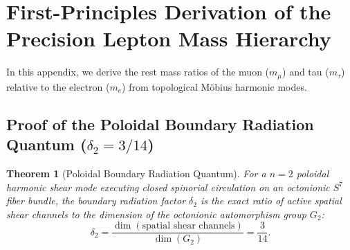 \documentclass[11pt,a4paper]{article}
\newtheorem{thm}{Theorem}
\begin{document}
	\section{First-Principles Derivation of the Precision Lepton Mass Hierarchy}
	\label{app:lepton_hierarchy}
	
	In this appendix, we derive the rest mass ratios of the muon ($m_\mu$) and tau ($m_\tau$) relative to the electron ($m_e$) from topological Möbius harmonic modes.
	
	\subsection{Proof of the Poloidal Boundary Radiation Quantum (\texorpdfstring{$\delta_2 = 3/14$}{delta_2 = 3/14})}
	\label{app:g2_delta2_proof}
	
	\begin{thm}[Poloidal Boundary Radiation Quantum]
		\label{thm:delta2_g2}
		For a $n=2$ poloidal harmonic shear mode executing closed spinorial circulation on an octonionic $S^7$ fiber bundle, the boundary radiation factor $\delta_2$ is the exact ratio of active spatial shear channels to the dimension of the octonionic automorphism group $G_2$:
		\begin{equation}
			\delta_2 = \frac{\dim(\text{spatial shear channels})}{\dim(G_2)} = \frac{3}{14}.
			\label{eq:delta2_theorem}
		\end{equation}
	\end{thm}
	
\end{document}
